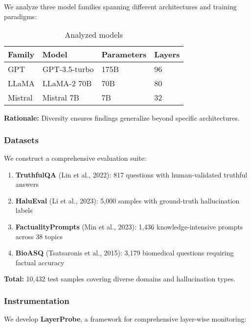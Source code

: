 \documentclass[11pt]{article}
\begin{document}
We analyze three model families spanning different architectures and training paradigms:

\begin{table}[H]
\centering
\begin{tabular}{@{}llll@{}}
\toprule
\textbf{Family} & \textbf{Model} & \textbf{Parameters} & \textbf{Layers} \\ \midrule
GPT & GPT-3.5-turbo & 175B & 96 \\
LLaMA & LLaMA-2 70B & 70B & 80 \\
Mistral & Mistral 7B & 7B & 32 \\ \bottomrule
\end{tabular}
\caption{Analyzed models}
\end{table}

\textbf{Rationale:} Diversity ensures findings generalize beyond specific architectures.

\subsubsection{Datasets}

We construct a comprehensive evaluation suite:

\begin{enumerate}
    \item \textbf{TruthfulQA} (Lin et al., 2022): 817 questions with human-validated truthful answers
    \item \textbf{HaluEval} (Li et al., 2023): 5,000 samples with ground-truth hallucination labels
    \item \textbf{FactualityPrompts} (Min et al., 2023): 1,436 knowledge-intensive prompts across 38 topics
    \item \textbf{BioASQ} (Tsatsaronis et al., 2015): 3,179 biomedical questions requiring factual accuracy
\end{enumerate}

\textbf{Total:} 10,432 test samples covering diverse domains and hallucination types.

\subsubsection{Instrumentation}

We develop \textbf{LayerProbe}, a framework for comprehensive layer-wise monitoring:
\end{document}
